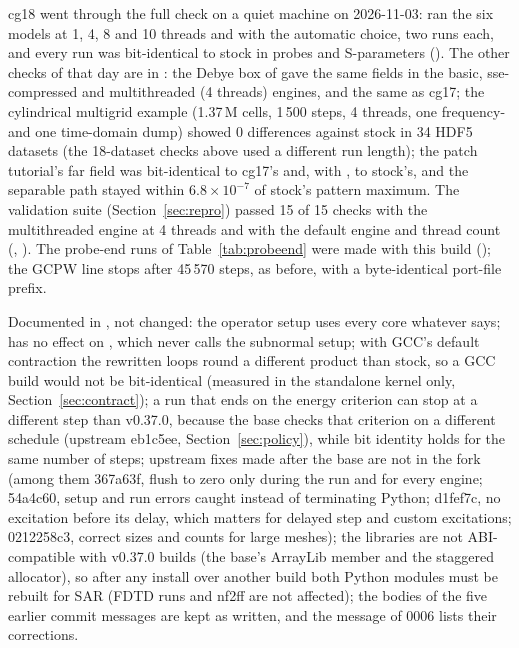 cg18 went through the full check on a quiet machine on 2026-11-03:  ran the six models at
1, 4, 8 and 10 threads and with the automatic choice, two runs each, and every run was bit-identical to stock in
probes and S-parameters (). The other checks of that day are in
: the Debye box of  gave the same fields in the
basic, sse-compressed and multithreaded (4 threads) engines, and the same as cg17; the cylindrical multigrid example
(1.37\,M cells, 1\,500 steps, 4 threads, one frequency- and one time-domain dump) showed 0 differences against stock
in 34 HDF5 datasets (the 18-dataset checks above used a different run length); the patch tutorial's far field was
bit-identical to cg17's and, with , to stock's, and the separable path stayed within
$6.8\times10^{-7}$ of stock's pattern maximum. The validation suite (Section~\ref{sec:repro}) passed 15 of 15 checks
with the multithreaded engine at 4 threads and with the default engine and thread count
(, ). The probe-end runs of
Table~\ref{tab:probeend} were made with this build (); the GCPW line stops
after 45\,570 steps, as before, with a byte-identical port-file prefix.

Documented in , not changed: the operator setup uses every core whatever  says;
 has no effect on , which never calls the subnormal setup; with GCC's default
contraction the rewritten loops round a different product than stock, so a GCC build would not be bit-identical
(measured in the standalone kernel only, Section~\ref{sec:contract}); a run that ends on the energy
criterion can stop at a different step than v0.37.0, because the base checks that criterion on a different schedule
(upstream eb1c5ee, Section~\ref{sec:policy}), while bit identity holds for the same number of steps; upstream fixes
made after the base are not in the fork (among them 367a63f, flush to zero only during the run and
for every engine; 54a4c60, setup and run errors caught instead of terminating Python; d1fef7c, no excitation before
its delay, which matters for delayed step and custom excitations; 0212258c3, correct sizes and counts for large
meshes); the libraries are not ABI-compatible with v0.37.0 builds (the base's ArrayLib  member and the
staggered allocator), so after any install over another build both Python modules must be rebuilt for SAR (FDTD
runs and nf2ff are not affected); the bodies of the five earlier commit messages are kept as written, and the message
of 0006 lists their corrections.

